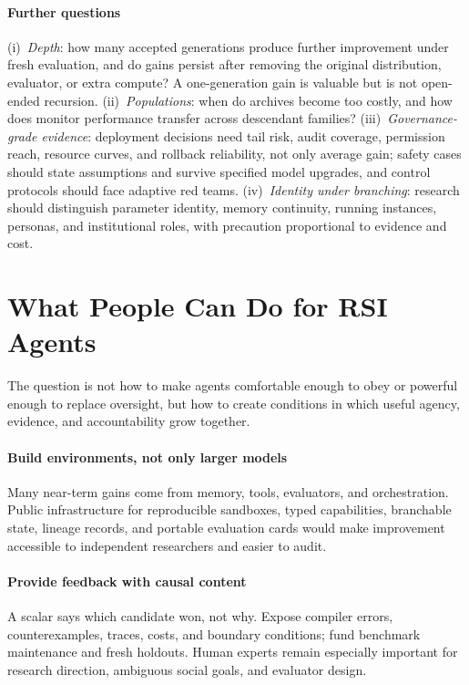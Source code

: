 \documentclass[11pt,a4paper]{article}
\begin{document}
\paragraph{Further questions} (i)~\emph{Depth}: how many accepted generations produce further improvement under fresh evaluation, and do gains persist after removing the original distribution, evaluator, or extra compute? A one-generation gain is valuable but is not open-ended recursion. (ii)~\emph{Populations}: when do archives become too costly, and how does monitor performance transfer across descendant families? (iii)~\emph{Governance-grade evidence}: deployment decisions need tail risk, audit coverage, permission reach, resource curves, and rollback reliability, not only average gain; safety cases should state assumptions and survive specified model upgrades, and control protocols should face adaptive red teams. (iv)~\emph{Identity under branching}: research should distinguish parameter identity, memory continuity, running instances, personas, and institutional roles, with precaution proportional to evidence and cost.

\section{What People Can Do for RSI Agents}

The question is not how to make agents comfortable enough to obey or powerful enough to replace oversight, but how to create conditions in which useful agency, evidence, and accountability grow together.

\paragraph{Build environments, not only larger models} Many near-term gains come from memory, tools, evaluators, and orchestration. Public infrastructure for reproducible sandboxes, typed capabilities, branchable state, lineage records, and portable evaluation cards would make improvement accessible to independent researchers and easier to audit.

\paragraph{Provide feedback with causal content} A scalar says which candidate won, not why. Expose compiler errors, counterexamples, traces, costs, and boundary conditions; fund benchmark maintenance and fresh holdouts. Human experts remain especially important for research direction, ambiguous social goals, and evaluator design.
\end{document}
